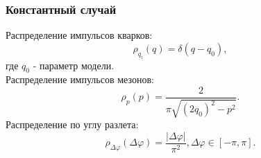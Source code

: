 \documentclass{beamer}
\renewcommand{\l}{\left( }
\renewcommand{\r}{\right) }
\renewcommand{\phi}{\varphi}
\newcommand{\br}[1]{\l {#1} \r}
\newcommand{\abs}[1]{\left| #1 \right|}
\begin{document}
\begin{frame}[fragile]
\frametitle{Константный случай}
\begin{minipage}[h]{0.53\linewidth}
Распределение импульсов кварков:
$$\rho_{q_i} \br{q} = \delta \br{q - q_0},$$
где $q_0$ - параметр модели.
$$$$
Распределение импульсов мезонов:
$$\rho_p \br{p} = \frac{2}{\pi\sqrt{\br{2 q_0}^2 -p^2}}.$$
Распределение по углу разлета:
$$\rho_{\Delta \phi} \br{\Delta \phi} = \frac{\abs{\Delta \phi}}{\pi^2}, \Delta \phi \in \left[ -\pi, \pi \right].$$
\end{minipage}
\begin{minipage}[h]{0.43\linewidth}
\end{minipage}
\end{frame}
\end{document}
